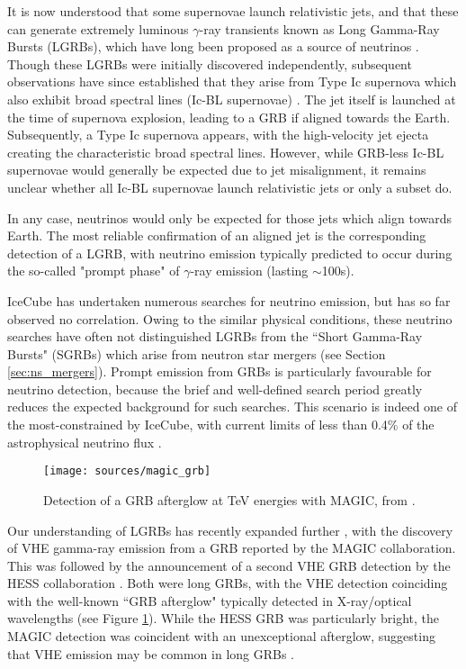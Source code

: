 It is now understood that some supernovae launch relativistic jets, and that these can generate extremely luminous $\gamma$-ray transients known as Long Gamma-Ray Bursts (LGRBs), which have long been proposed as a source of neutrinos . Though these LGRBs were initially discovered independently, subsequent observations have since established that they arise from Type Ic supernova which also exhibit broad spectral lines (Ic-BL supernovae) . The jet itself is launched at the time of supernova explosion, leading to a GRB if aligned towards the Earth. Subsequently, a Type Ic supernova appears, with the high-velocity jet ejecta creating the characteristic broad spectral lines. However, while GRB-less Ic-BL supernovae would generally be expected due to jet misalignment, it remains unclear whether all Ic-BL supernovae launch relativistic jets or only a subset do.

In any case, neutrinos would only be expected for those jets which align towards Earth. The most reliable confirmation of an aligned jet is the corresponding detection of a LGRB, with neutrino emission typically predicted to occur during the so-called "prompt phase" of $\gamma$-ray emission (lasting $\sim$100s). 

IceCube has undertaken numerous searches for neutrino emission, but has so far observed no correlation. Owing to the similar physical conditions, these neutrino searches have often not distinguished LGRBs from the ``Short Gamma-Ray Bursts" (SGRBs) which arise from neutron star mergers (see Section \ref{sec:ns_mergers}). Prompt emission from GRBs is particularly favourable for neutrino detection, because the brief and well-defined search period greatly reduces the expected background for such searches. This scenario is indeed one of the most-constrained by IceCube, with current limits of less than 0.4\% of the astrophysical neutrino flux . 

\begin{figure}[!ht]
	\centering \texttt{[image: sources/magic\_grb]}
	\caption{Detection of a GRB afterglow at TeV energies with MAGIC, from \cite{magic_grb_19}.}
	\label{fig:magic_grb}
\end{figure}

Our understanding of LGRBs has recently expanded further , with the discovery of VHE gamma-ray emission from a GRB reported by the MAGIC collaboration. This was followed by the announcement of a second VHE GRB detection by the HESS collaboration . Both were long GRBs, with the VHE detection coinciding with the well-known ``GRB afterglow" typically detected in X-ray/optical wavelengths (see Figure \ref{fig:magic_grb}). While the HESS GRB was particularly bright, the MAGIC detection was coincident with an unexceptional afterglow, suggesting that VHE emission may be common in long GRBs .


